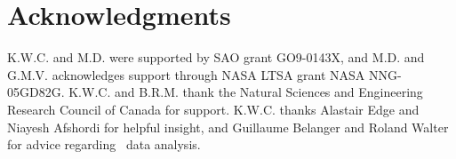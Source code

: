 \documentclass[useAMS,usenatbib]{mn2e}
\begin{document}
\section*{Acknowledgments}

K.W.C. and M.D. were supported by SAO grant GO9-0143X, and M.D. and
G.M.V.  acknowledges support through NASA LTSA grant NASA
NNG-05GD82G. K.W.C. and B.R.M. thank the Natural Sciences and
Engineering Research Council of Canada for support. K.W.C. thanks
Alastair Edge and Niayesh Afshordi for helpful insight, and Guillaume
Belanger and Roland Walter for advice regarding \integral\ data
analysis.






\clearpage
\onecolumn




\clearpage



\label{lastpage}
\end{document}
